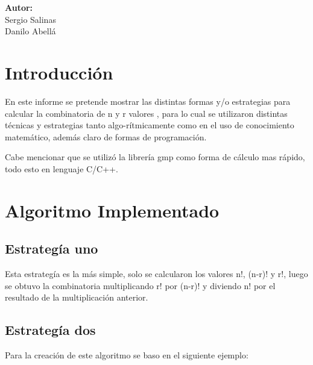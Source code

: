 \documentclass[12pt,letterpaper]{scrartcl}
\begin{document}
\begin{titlepage}
\begin{center}
\begin{minipage}[l]{0.4\textwidth}
	\begin{flushright}

		\textbf{\textsf{Autor:}}\\
		\linespread{1}
		\large Sergio Salinas\\
		\large Danilo Abellá\\

	\end{flushright}
\end{minipage}

\end{center}

\end{titlepage}

\section*{Introducción}

En este informe se pretende mostrar las distintas formas y/o estrategias para calcular la combinatoria de n y r valores , para lo cual se utilizaron distintas técnicas y estrategias tanto algo-rítmicamente como en el uso de conocimiento matemático, además claro de formas de programación.

Cabe mencionar que se utilizó la librería gmp como forma de cálculo mas rápido, todo esto en lenguaje C/C++.

\newpage

\section{Algoritmo Implementado}

\subsection{Estrategía uno}

Esta estrategía es la más simple, solo se calcularon los valores n!, (n-r)! y r!, luego  se obtuvo la combinatoria multiplicando r! por (n-r)! y diviendo n! por el resultado de la multiplicación anterior.

\subsection{Estrategía dos}

Para la creación de este algoritmo se baso en el siguiente ejemplo:
\end{document}
